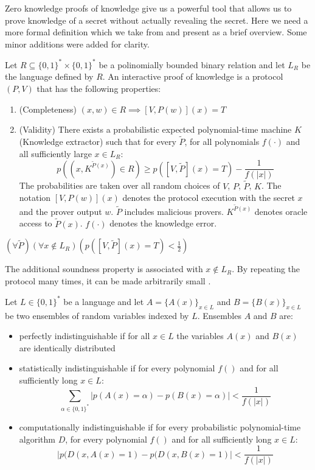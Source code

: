 Zero knowledge proofs of knowledge give us a powerful tool that allows
us to prove knowledge of a secret without actually revealing the
secret.  Here we need a more formal definition which we take from
\cite{Cameni98} and present as a brief overview. Some minor additions
were added for clarity.

\begin{defn}
  Let $R \subseteq \{0,1\}^* \times \{0,1\}^*$ be a polinomially
  bounded binary relation and let $L_R$ be the language defined by
  $R$. An interactive proof of knowledge is a protocol $(P, V)$ that
  has the following properties:
  \begin{enumerate}
  \item (Completeness) $(x,w) \in R \implies [V, P(w)](x) = T$
  \item (Validity) There exists a probabilistic expected polynomial-time
    machine $K$ (Knowledge extractor) such that for every $\tilde{P}$, for
    all polynomials $f(\cdot)$ and all sufficiently large $x \in L_R$:
    \[
    p((x, K^{\tilde{P}(x)}) \in R) \geq p([V, \tilde{P}](x) = T) -
    \frac{1}{f(|x|)}
    \]
    The probabilities are taken over all random choices of $V$, $P$,
    $\tilde{P}$, $K$. The notation $\left[V, P(w)\right](x)$ denotes
    the protocol execution with the secret $x$ and the prover output
    $w$. $\tilde{P}$ includes malicious provers. $K^{\tilde{P}(x)}$
    denotes oracle access to $\tilde{P}(x)$. $f(\cdot)$ denotes the
    knowledge error.
  \end{enumerate}
\end{defn}

\begin{defn}[Soundness] $(\forall \tilde{P})(\forall x \notin
  L_R)(p([V, \tilde{P}](x) = T) < \frac{1}{2})$
\end{defn}
The additional soundness property is associated with $x \notin L_R$.  By
repeating the protocol many times, it can be made arbitrarily small
\cite{Cameni98}.

\begin{defn}[Indistinguishability]
  Let $L \in \{0,1\}^*$ be a language and let $A = \{A(x)\}_{x \in L}$
  and $B = \{B(x)\}_{x \in L}$ be two ensembles of random variables
  indexed by $L$. Ensembles $A$ and $B$ are:
  \begin{itemize}
  \item perfectly indistinguishable if for all $x \in L$ the variables
    $A(x)$ and $B(x)$ are identically distributed
  \item statistically indistinguishable if for every polynomial $f()$
    and for all sufficiently long $x \in L$:
    \[
    \sum_{\alpha \in \{0,1\}^*} | p(A(x) = \alpha) - p(B(x) = \alpha)|
    < \frac{1}{f(|x|)}
    \]
  \item computationally indistinguishable if for every probabilistic
    polynomial-time algorithm $D$, for every polynomial $f()$ and for
    all sufficiently long $x \in L$:
    \[
    |p(D(x, A(x) = 1) - p(D(x, B(x) = 1)| < \frac{1}{f(|x|)}
    \]
  \end{itemize}
\end{defn}

